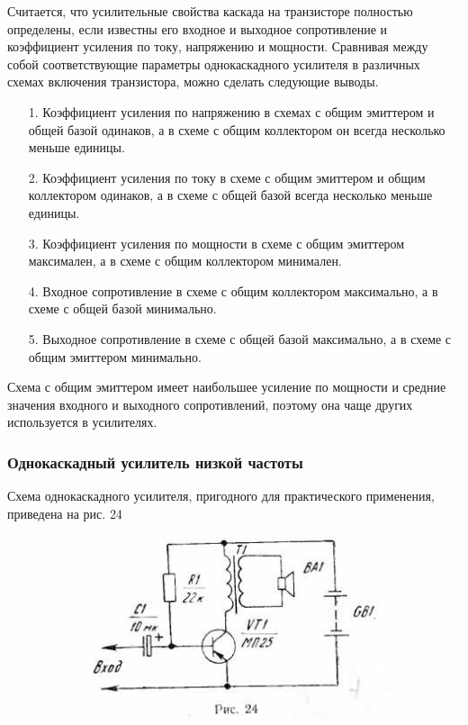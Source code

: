 \documentclass[12pt]{article}
\begin{document}
Считается, что усилительные свойства каскада на транзисторе полностью определены, если известны его входное и выходное сопротивление и коэффициент усиления по току, напряжению и мощности. Сравнивая между собой соответствующие параметры однокаскадного усилителя в различных схемах включения транзистора, можно сделать следующие выводы.

\begin{itemize}
\item[1.] Коэффициент усиления по напряжению в схемах с общим эмиттером и общей базой одинаков, а в схеме с общим коллектором он всегда несколько меньше единицы.
\item[2.] Коэффициент усиления по току в схеме с общим эмиттером и общим коллектором одинаков, а в схеме с общей базой всегда несколько меньше единицы.
\item[3.] Коэффициент усиления по мощности в схеме с общим эмиттером максимален, а в схеме с общим коллектором минимален.
\item[4.] Входное сопротивление в схеме с общим коллектором максимально, а в схеме с общей базой минимально.
\item[5.] Выходное сопротивление в схеме с общей базой максимально, а в схеме с общим эмиттером минимально.
\end{itemize}

Схема с общим эмиттером имеет наибольшее усиление по мощности и средние значения входного и выходного сопротивлений, поэтому она чаще других используется в усилителях.
\newpage
\subsubsection{Однокаскадный усилитель низкой частоты}

Схема однокаскадного усилителя, пригодного для практического применения, приведена на рис. 24

\includegraphics[width=\textwidth, angle=-1]{ekon3_021_1}

\hrulefill
\end{document}
